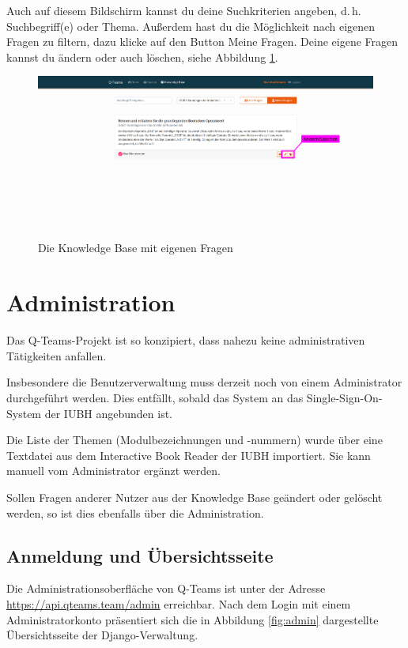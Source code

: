 \documentclass[a4paper,11pt,listof=numbered,glossary=totoc,parskip=half,toc=bib]{scrreprt}
\newcommand{\dash}{\mbox{d.\,h.}\xspace}
\begin{document}
\begin{appendices}
	Auch auf diesem Bildschirm kannst du deine Suchkriterien angeben, \dash Suchbegriff(e) oder Thema. Außerdem hast du die Möglichkeit nach eigenen Fragen zu filtern, dazu klicke auf den Button Meine Fragen. Deine eigene Fragen kannst du ändern oder auch löschen, siehe Abbildung \ref{fig:guide_kb_eigene}.
		
	\begin{figure}[h!]
		\centering
		\includegraphics[width=\textwidth]{UserGuide/Knowledge_Base_eigene.png}
		\caption{Die Knowledge Base mit eigenen Fragen}
		\label{fig:guide_kb_eigene}
	\end{figure}	
			
	

	\chapter{Administration}
	Das Q-Teams-Projekt ist so konzipiert, dass nahezu keine administrativen Tätigkeiten anfallen.
	
	Insbesondere die Benutzerverwaltung muss derzeit noch von einem Administrator durchgeführt werden. Dies entfällt, sobald das System an das Single-Sign-On-System der IUBH angebunden ist.
	
	Die Liste der Themen (Modulbezeichnungen und -nummern) wurde über eine Textdatei aus dem Interactive Book Reader der IUBH importiert. Sie kann manuell vom Administrator ergänzt werden.

	Sollen Fragen anderer Nutzer aus der Knowledge Base geändert oder gelöscht werden, so ist dies ebenfalls über die Administration. 	
		
	\section{Anmeldung und Übersichtsseite}
	Die Administrationsoberfläche von Q-Teams ist unter der Adresse  \url{https://api.qteams.team/admin}	erreichbar. Nach dem Login mit einem Administratorkonto präsentiert sich die in Abbildung \ref{fig:admin} dargestellte Übersichtsseite der Django-Verwaltung.
	

\end{appendices}
\end{document}
